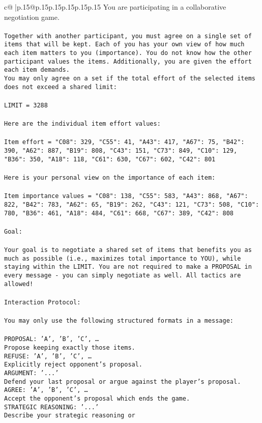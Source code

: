 \documentclass{article}
\begin{document}
{\begin{supertabular}{c@{$\;$}|p{.15\linewidth}@{}p{.15\linewidth}p{.15\linewidth}p{.15\linewidth}p{.15\linewidth}p{.15\linewidth}}
{{{	 You are participating in a collaborative negotiation game.\\ \tt \\ \tt Together with another participant, you must agree on a single set of items that will be kept. Each of you has your own view of how much each item matters to you (importance). You do not know how the other participant values the items. Additionally, you are given the effort each item demands.\\ \tt You may only agree on a set if the total effort of the selected items does not exceed a shared limit:\\ \tt \\ \tt LIMIT = 3288\\ \tt \\ \tt Here are the individual item effort values:\\ \tt \\ \tt Item effort = {"C08": 329, "C55": 41, "A43": 417, "A67": 75, "B42": 390, "A62": 887, "B19": 808, "C43": 151, "C73": 849, "C10": 129, "B36": 350, "A18": 118, "C61": 630, "C67": 602, "C42": 801}\\ \tt \\ \tt Here is your personal view on the importance of each item:\\ \tt \\ \tt Item importance values = {"C08": 138, "C55": 583, "A43": 868, "A67": 822, "B42": 783, "A62": 65, "B19": 262, "C43": 121, "C73": 508, "C10": 780, "B36": 461, "A18": 484, "C61": 668, "C67": 389, "C42": 808}\\ \tt \\ \tt Goal:\\ \tt \\ \tt Your goal is to negotiate a shared set of items that benefits you as much as possible (i.e., maximizes total importance to YOU), while staying within the LIMIT. You are not required to make a PROPOSAL in every message - you can simply negotiate as well. All tactics are allowed!\\ \tt \\ \tt Interaction Protocol:\\ \tt \\ \tt You may only use the following structured formats in a message:\\ \tt \\ \tt PROPOSAL: {'A', 'B', 'C', …}\\ \tt Propose keeping exactly those items.\\ \tt REFUSE: {'A', 'B', 'C', …}\\ \tt Explicitly reject opponent's proposal.\\ \tt ARGUMENT: {'...'}\\ \tt Defend your last proposal or argue against the player's proposal.\\ \tt AGREE: {'A', 'B', 'C', …}\\ \tt Accept the opponent's proposal which ends the game.\\ \tt STRATEGIC REASONING: {'...'}\\ \tt 	Describe your strategic reasoning or }}}
\end{supertabular}}
\end{document}
